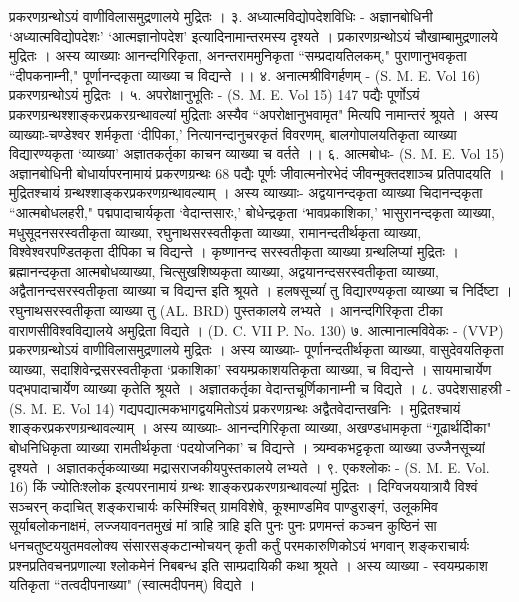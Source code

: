 प्रकरणग्रन्थोऽयं वाणीविलासमुद्रणालये मुद्रितः ।
३. अध्यात्मविद्योपदेशविधिः -
अज्ञानबोधिनी `अध्यात्मविद्योपदेशः' `आत्मज्ञानोपदेश' इत्यादिनामान्तरमस्य दृश्यते । प्रकारणग्रन्थोऽयं चौखाम्बामुद्रणालये मुद्रितः । अस्य व्याख्याः आनन्दगिरिकृता, अनन्तराममुनिकृता ``सम्प्रदायतिलकम्," पुराणानुभवकृता ``दीपकनाम्नी," पूर्णानन्दकृता व्याख्या च विद्यन्ते ।।
४. अनात्मश्रीविगर्हणम् - (S. M. E. Vol 16) प्रकरणग्रन्थोऽयं मुद्रितः ।
५. अपरोक्षानुभूतिः - (S. M. E. Vol 15)
147 पद्यैः पूर्णोऽयं प्रकरणग्रन्थश्शाङ्करप्रकरग्रन्थावल्यां मुद्रिताः अस्यैव ``अपरोक्षानुभवामृत" मित्यपि नामान्तरं श्रूयते । अस्य व्याख्याः-चण्डेश्वर शर्मकृता `दीपिका,' नित्यानन्दानुचरकृतं विवरणम्, बालगोपालयतिकृता व्याख्या विद्यारण्यकृता `व्याख्या' अज्ञातकर्तृका काचन व्याख्या च वर्तते ।।
६. आत्मबोधः- (S. M. E. Vol 15)
अज्ञानबोधिनी बोधार्यापरनामायं प्रकरणग्रन्थः 68 पद्यैः पूर्णः जीवात्मनोरभेदं जीवन्मुक्तदशाञ्च प्रतिपादयति । मुद्रितश्चायं ग्रन्थश्शाङ्करप्रकरणग्रन्थावल्याम् ।
अस्य व्याख्याः- अद्वयानन्दकृता व्याख्या चिदानन्दकृता ``आत्मबोधलहरी," पद्मपादाचार्यकृता `वेदान्तसारः,' बोधेन्द्रकृता `भावप्रकाशिका,' भासुरानन्दकृता व्याख्या, मधुसूदनसरस्वतीकृता व्याख्या, रघुनाथसरस्वतीकृता व्याख्या, रामानन्दतीर्थकृता व्याख्या, विश्वेश्वरपण्डितकृता दीपिका च विद्यन्ते । कृष्णानन्द सरस्वतीकृता व्याख्या ग्रन्थलिप्यां मुद्रितः । ब्रह्मानन्दकृता आत्मबोधव्याख्या, चित्सुखशिष्यकृता व्याख्या, अद्वयानन्दसरस्वतीकृता व्याख्या, अद्वैतानन्दसरस्वतीकृता व्याख्या च विद्यन्त इति श्रूयते । हलषसूच्यांं तु विद्यारण्यकृता व्याख्या च निर्दिष्टा । रघुनाथसरस्वतीकृता व्याख्या तु (AL. BRD) पुस्तकालये लभ्यते । आनन्दगिरिकृता टीका वाराणसीविश्वविद्यालये अमुद्रिता विद्यते । (D. C. VII P. No. 130)
७. आत्मानात्मविवेकः - (VVP)
प्रकरणग्रन्थोऽयं वाणीविलासमुद्रणालये मुद्रितः । अस्य व्याख्याः- पूर्णानन्दतीर्थकृता व्याख्या, वासुदेवयतिकृता व्याख्या, सदाशिवेन्द्रसरस्वतीकृता `प्रकाशिका' स्वयम्प्रकाशयतिकृता व्याख्या, च विद्यन्ते । सायमाचार्येण पद्भपादाचार्येण व्याख्या कृतेति श्रूयते । अज्ञातकर्तृका वेदान्तचूर्णिकानाम्नी च विद्यते ।
८. उपदेशसाहस्री - (S. M. E. Vol 14)
गद्यपद्यात्मकभागद्वयमितोऽयं प्रकरणग्रन्थः अद्वैतवेदान्तखनिः । मुद्रितश्चायं शाङ्करप्रकरणग्रन्थावल्याम् । अस्य व्याख्याः- आनन्दगिरिकृता व्याख्या, अखण्डधामकृता ``गूढार्थदीिका" बोधनिधिकृता व्याख्या रामतीर्थकृता `पदयोजनिका' च विद्यन्ते । त्र्यम्वकभट्टकृता व्याख्या उज्जैनसूच्यां दृश्यते । अज्ञातकर्तृकव्याख्या मद्रासराजकीयपुस्तकालये लभ्यते । 
९. एकश्लोकः - (S. M. E. Vol. 16)
किं ज्योतिःश्लोक इत्यपरनामायं ग्रन्थः शाङ्करप्रकरणग्रन्थावल्यां मुद्रितः । दिग्विजययात्रायै विश्वं सञ्चरन् कदाचित् शङ्कराचार्यः कस्मिंश्चित् ग्रामविशेषे, कूश्माण्डमिव पाण्डुराङ्गं, उलूकमिव सूर्याबलोकनाक्षमं, लज्जयावनतमुखं मां त्राहि त्राहि इति पुनः पुनः प्रणमन्तं कञ्चन कुष्ठिनं सा धनचतुष्टययुतमवलोक्य संसारसङ्कटान्मोचयन् कृती कर्तुं परमकारुणिकोऽयं भगवान् शङ्कराचार्यः प्रश्नप्रतिवचनप्रणाल्या श्लोकमेनं निबबन्ध इति साम्प्रदायिकी कथा श्रूयते । अस्य व्याख्या - स्वयम्प्रकाश यतिकृता ``तत्वदीपनाख्या" (स्वात्मदीपनम्) विद्यते ।
